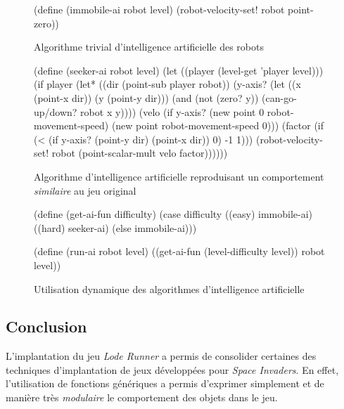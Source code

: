 \documentclass[12pt,twoside,letterpaper,francais]{book}
\begin{document}
\begin{figure}[htb!]
  \begin{schemecode}
(define (immobile-ai robot level)
  (robot-velocity-set! robot point-zero))
  \end{schemecode}
  \caption{Algorithme trivial d'intelligence artificielle des robots}
  \label{Exp:ai-imm}
\end{figure}

\begin{figure}[htb!]
  \begin{schemecode}
(define (seeker-ai robot level)
  (let ((player (level-get 'player level)))
    (if player
        (let* ((dir (point-sub player robot))
               (y-axis? (let ((x (point-x dir)) (y (point-y dir)))
                          (and (not (zero? y))
                               (can-go-up/down? robot x y))))
               (velo (if y-axis?
                         (new point 0 robot-movement-speed)
                         (new point robot-movement-speed 0)))
               (factor (if (< (if y-axis? (point-y dir) (point-x dir)) 0)
                           -1
                           1)))
          (robot-velocity-set! robot (point-scalar-mult velo factor))))))
  \end{schemecode}
  \caption{Algorithme d'intelligence artificielle reproduisant un
    comportement \emph{similaire} au jeu original}
  \label{Exp:ai-seek}
\end{figure}

\begin{figure}[htb!]
  \begin{schemecode}
(define (get-ai-fun difficulty)
  (case difficulty
    ((easy) immobile-ai)
    ((hard) seeker-ai)
    (else immobile-ai)))

(define (run-ai robot level)
  ((get-ai-fun (level-difficulty level)) robot level))
  \end{schemecode}
  \caption{Utilisation dynamique des algorithmes d'intelligence
    artificielle}
  \label{Exp:dyn-ai}
\end{figure}


\FloatBarrier
\subsection{Conclusion}
L'implantation du jeu \textit{Lode Runner} a permis de consolider certaines des
techniques d'implantation de jeux développées pour \textit{Space Invaders}. En effet,
l'utilisation de fonctions génériques a permis d'exprimer simplement
et de manière très \emph{modulaire} le comportement des objets dans le
jeu.
\end{document}
